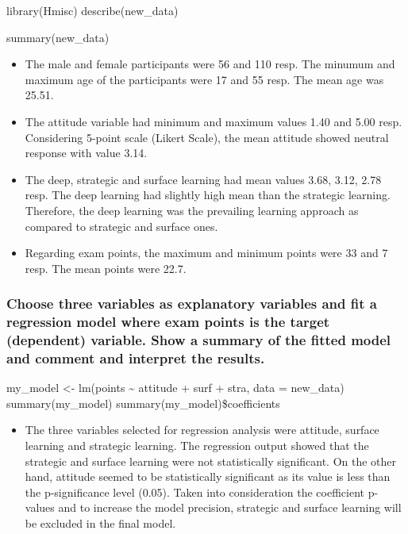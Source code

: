 \documentclass[]{article}
\providecommand{\tightlist}{%
  \setlength{\itemsep}{0pt}\setlength{\parskip}{0pt}}
\begin{document}
library(Hmisc) describe(new\_data)

summary(new\_data)

\begin{itemize}
\item
  The male and female participants were 56 and 110 resp. The minumum and
  maximum age of the participants were 17 and 55 resp. The mean age was
  25.51.
\item
  The attitude variable had minimum and maximum values 1.40 and 5.00
  resp. Considering 5-point scale (Likert Scale), the mean attitude
  showed neutral response with value 3.14.
\item
  The deep, strategic and surface learning had mean values 3.68, 3.12,
  2.78 resp. The deep learning had slightly high mean than the strategic
  learning. Therefore, the deep learning was the prevailing learning
  approach as compared to strategic and surface ones.
\item
  Regarding exam points, the maximum and minimum points were 33 and 7
  resp. The mean points were 22.7.
\end{itemize}

\subsubsection{Choose three variables as explanatory variables and fit a
regression model where exam points is the target (dependent) variable.
Show a summary of the fitted model and comment and interpret the
results.}\label{choose-three-variables-as-explanatory-variables-and-fit-a-regression-model-where-exam-points-is-the-target-dependent-variable.-show-a-summary-of-the-fitted-model-and-comment-and-interpret-the-results.}

my\_model \textless{}- lm(points \textasciitilde{} attitude + surf +
stra, data = new\_data) summary(my\_model)
summary(my\_model)\$coefficients

\begin{itemize}
\tightlist
\item
  The three variables selected for regression analysis were attitude,
  surface learning and strategic learning. The regression output showed
  that the strategic and surface learning were not statistically
  significant. On the other hand, attitude seemed to be statistically
  significant as its value is less than the p-significance level (0.05).
  Taken into consideration the coefficient p-values and to increase the
  model precision, strategic and surface learning will be excluded in
  the final model.
\end{itemize}
\end{document}

